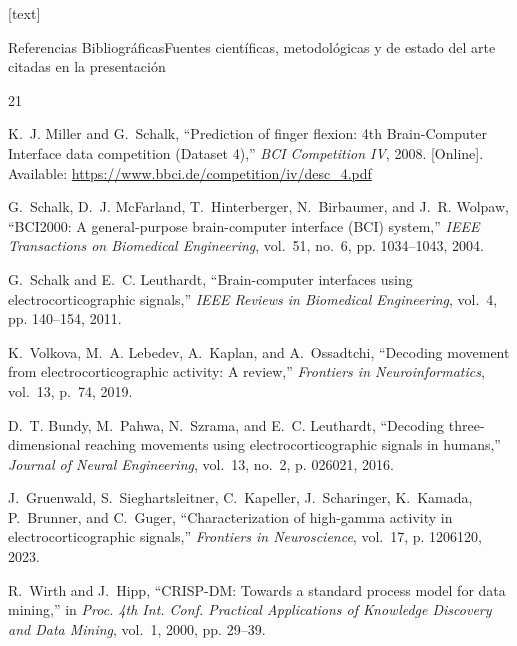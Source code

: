 \bibslidetrue
{}[text]
\begin{frame}[allowframebreaks]{Referencias Bibliogr\'aficas}{Fuentes cient\'ificas, metodol\'ogicas y de estado del arte citadas en la presentaci\'on}
  \scriptsize
  \begin{thebibliography}{21}
    \setlength{\itemsep}{3.5pt}

    K.~J. Miller and G.~Schalk, ``Prediction of finger flexion: 4th {Brain-Computer Interface} data competition ({Dataset 4}),'' \emph{BCI Competition IV}, 2008. [Online]. Available: \url{https://www.bbci.de/competition/iv/desc_4.pdf}

    G.~Schalk, D.~J. McFarland, T.~Hinterberger, N.~Birbaumer, and J.~R. Wolpaw, ``{BCI2000}: A general-purpose brain-computer interface ({BCI}) system,'' \emph{IEEE Transactions on Biomedical Engineering}, vol.~51, no.~6, pp. 1034--1043, 2004.

    G.~Schalk and E.~C. Leuthardt, ``Brain-computer interfaces using electrocorticographic signals,'' \emph{IEEE Reviews in Biomedical Engineering}, vol.~4, pp. 140--154, 2011.

    K.~Volkova, M.~A. Lebedev, A.~Kaplan, and A.~Ossadtchi, ``Decoding movement from electrocorticographic activity: A review,'' \emph{Frontiers in Neuroinformatics}, vol.~13, p.~74, 2019.

    D.~T. Bundy, M.~Pahwa, N.~Szrama, and E.~C. Leuthardt, ``Decoding three-dimensional reaching movements using electrocorticographic signals in humans,'' \emph{Journal of Neural Engineering}, vol.~13, no.~2, p. 026021, 2016.

    J.~Gruenwald, S.~Sieghartsleitner, C.~Kapeller, J.~Scharinger, K.~Kamada, P.~Brunner, and C.~Guger, ``Characterization of high-gamma activity in electrocorticographic signals,'' \emph{Frontiers in Neuroscience}, vol.~17, p. 1206120, 2023.

    R.~Wirth and J.~Hipp, ``{CRISP-DM}: Towards a standard process model for data mining,'' in \emph{Proc. 4th Int. Conf. Practical Applications of Knowledge Discovery and Data Mining}, vol.~1, 2000, pp. 29--39.


\end{thebibliography}
\end{frame}
